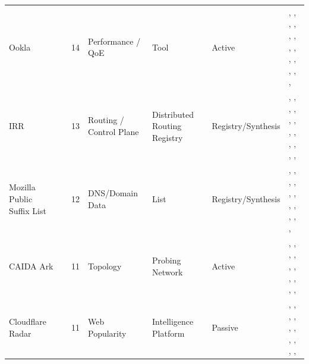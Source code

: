 \documentclass[11pt,a4paper]{article}
\begin{document}
\begin{longtable}{@{}p{}p{}p{}p{}p{}p{}p{}@{}}
Ookla & \cite{ooklaspeedtest} & 14 & Performance / QoE & Tool & Active & \cite{10.1145/3730567.3732914}, \cite{10.1145/3730567.3764491}, \cite{10.1145/3646547.3689007}, \cite{10.1145/3646547.3688441}, \cite{10.1145/3517745.3561416}, \cite{10.1145/3517745.3561441}, \cite{10.1145/3487552.3487862}, \cite{10.1007/978-3-030-98785-5_4}, \cite{10.1007/978-3-030-98785-5_6}, \cite{10.1007/978-3-031-28486-1_1}, \cite{10.1007/978-3-031-28486-1_13}, \cite{10.1007/978-3-031-85960-1_20}, \cite{10.1145/3777912.3839816}, \cite{10.1145/3777912.3809140} \\
IRR & \cite{irr} & 13 & Routing / Control Plane & Distributed Routing Registry & Registry/Synthesis & \cite{10.1145/3730567.3732924}, \cite{10.1145/3646547.3688414}, \cite{10.1145/3646547.3689018}, \cite{10.1145/3646547.3688444}, \cite{10.1145/3618257.3624838}, \cite{10.1145/3618257.3624819}, \cite{10.1145/3618257.3624812}, \cite{10.1145/3517745.3561419}, \cite{10.1145/3517745.3561454}, \cite{10.1007/978-3-030-98785-5_14}, \cite{10.1007/978-3-032-18268-5_2}, \cite{10.1145/3777912.3809137}, \cite{10.1145/3777912.3809149} \\
Mozilla Public Suffix List & \cite{mozillapsl} & 12 & DNS/Domain Data & List & Registry/Synthesis & \cite{10.1145/3730567.3764501}, \cite{10.1145/3618257.3624836}, \cite{10.1145/3618257.3624797}, \cite{10.1145/3517745.3561418}, \cite{10.1145/3517745.3561444}, \cite{10.1145/3487552.3487820}, \cite{10.1007/978-3-031-28486-1_21}, \cite{10.1007/978-3-031-28486-1_22}, \cite{10.1007/978-3-031-28486-1_26}, \cite{10.1007/978-3-031-56249-5_10}, \cite{10.1145/3777912.3839832}, \cite{10.1145/3777912.3839791} \\
CAIDA Ark & \cite{caidaark} & 11 & Topology & Probing Network & Active & \cite{10.1145/3730567.3764457}, \cite{10.1145/3646547.3688429}, \cite{10.1145/3517745.3561440}, \cite{10.1007/978-3-030-72582-2_14}, \cite{10.1007/978-3-030-98785-5_7}, \cite{10.1007/978-3-030-98785-5_20}, \cite{10.1007/978-3-031-28486-1_16}, \cite{10.1145/3777912.3839832}, \cite{10.1145/3777912.3809137}, \cite{10.1145/3777912.3839804}, \cite{10.1145/3777912.3809149} \\
Cloudflare Radar & \cite{cloudflareradar} & 11 & Web Popularity & Intelligence Platform & Passive & \cite{10.1145/3730567.3764501}, \cite{10.1145/3646547.3688449}, \cite{10.1145/3646547.3688444}, \cite{10.1007/978-3-031-85960-1_3}, \cite{10.1007/978-3-031-85960-1_5}, \cite{10.1007/978-3-031-85960-1_13}, \cite{10.1007/978-3-032-18268-5_1}, \cite{10.1145/3777912.3839809}, \cite{10.1145/3777912.3839801}, \cite{10.1145/3777912.3839807}, \cite{10.1145/3777912.3839812} \\

\end{longtable}
\end{document}
